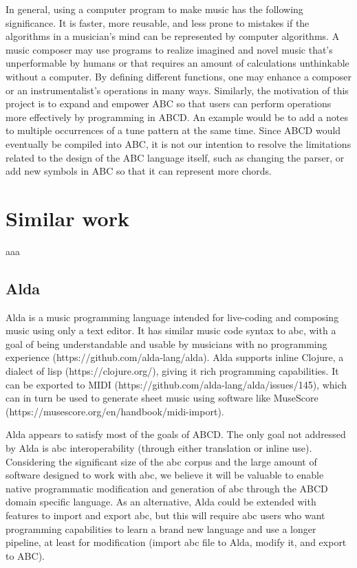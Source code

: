 In general, using a computer program to make music has the following significance. It is faster, more reusable, and less prone to mistakes if the algorithms in a musician's mind can be represented by computer algorithms. A music composer may use programs to realize imagined and novel music that’s unperformable by humans or that requires an amount of calculations unthinkable without a computer. By defining different functions, one may enhance a composer or an instrumentalist's operations in many ways\cite{Dobrian88}. Similarly, the motivation of this project is to expand and empower ABC so that users can perform operations more effectively by programming in ABCD. An example would be to add a notes to multiple occurrences of a tune pattern at the same time.  Since ABCD would eventually be compiled into ABC, it is not our intention to resolve the limitations related to the design of the ABC language itself, such as changing the parser, or add new symbols in ABC so that it can represent more chords. 
 


\section{Similar work}

aaa

\subsection{Alda}

Alda is a music programming language intended for live-coding and composing music using only a text editor. It has similar music code syntax to abc, with a goal of being understandable and usable by musicians with no programming experience (https://github.com/alda-lang/alda). Alda supports inline Clojure, a dialect of lisp (https://clojure.org/), giving it rich programming capabilities. It can be exported to MIDI (https://github.com/alda-lang/alda/issues/145), which can in turn be used to generate sheet music using software like MuseScore (https://musescore.org/en/handbook/midi-import). 


Alda appears to satisfy most of the goals of ABCD. The only goal not addressed by Alda is abc interoperability (through either translation or inline use). Considering the significant size of the abc corpus and the large amount of software designed to work with abc, we believe it will be valuable to enable native programmatic modification and generation of abc through the ABCD domain specific language. As an alternative, Alda could be extended with features to import and export abc, but this will require abc users who want programming capabilities to learn a brand new language and use a longer pipeline, at least for modification (import abc file to Alda, modify it, and export to ABC).


